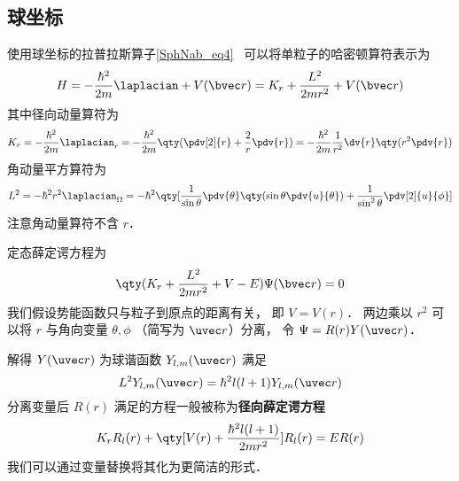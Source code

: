 

\subsection{球坐标}

使用球坐标的拉普拉斯算子\autoref{SphNab_eq4}~ 可以将单粒子的哈密顿算符表示为
\begin{equation}
H = -\frac{\hbar^2}{2m} \laplacian + V(\bvec r) =  K_r + \frac{L^2}{2mr^2} + V(\bvec r)
\end{equation}
其中径向动量算符为
\begin{equation}
K_r =-\frac{\hbar^2}{2m} \laplacian_r =  - \frac{\hbar^2}{2m} \qty(\pdv[2]{r} + \frac2r \pdv{r}) = -\frac{\hbar^2}{2m}\frac{1}{r^2} \dv{r} \qty(r^2\pdv{r})
\end{equation}
角动量平方算符为%
\begin{equation}\label{RadSE_eq3}
L^2 = -\hbar^2 r^2 \laplacian_\Omega = -\hbar^2 \qty[ \frac{1}{\sin\theta} \pdv{\theta} \qty(\sin \theta \pdv{u}{\theta}) + \frac{1}{\sin^2 \theta} \pdv[2]{u}{\phi}]
\end{equation}
注意角动量算符不含 $r$．

定态薛定谔方程为
\begin{equation}
\qty(K_r + \frac{L^2}{2mr^2} + V - E)\Psi(\bvec r) = 0
\end{equation}
我们假设势能函数只与粒子到原点的距离有关， 即 $V = V(r)$． 两边乘以 $r^2$ 可以将 $r$ 与角向变量 $\theta, \phi$ （简写为 $\uvec r$）分离， 令 $\Psi = R(r)Y(\uvec r)$．

解得 $Y(\uvec r)$ 为球谐函数 $Y_{l,m}(\uvec r)$ 满足
\begin{equation}
L^2 Y_{l,m}(\uvec r) = \hbar^2 l(l+1) Y_{l,m}(\uvec r)
\end{equation}
分离变量后 $R(r)$ 满足的方程一般被称为\textbf{径向薛定谔方程}
\begin{equation}\label{RadSE_eq6}
K_r R_l(r) + \qty[V(r) + \frac{\hbar^2 l(l+1)}{2mr^2} ]R_l(r) = ER(r)
\end{equation}
我们可以通过变量替换将其化为更简洁的形式．

